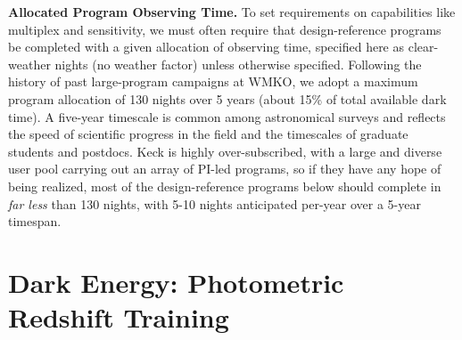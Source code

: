 \documentclass[11pt,a4paper,twoside,onecolumn,openany,final,oldfontcommands]{memoir}
\begin{document}
\noindent \textbf{Allocated Program Observing Time.}  To set requirements on capabilities like multiplex and sensitivity, we must often require that design-reference programs be completed with a given allocation of observing time, specified here as clear-weather nights (no weather factor) unless otherwise specified.  Following the history of past large-program campaigns at WMKO, we adopt a maximum program allocation of 130 nights over 5 years (about 15\% of total available dark time).  A five-year timescale is common among astronomical surveys and reflects the speed of scientific progress in the field and the timescales of graduate students and postdocs.  Keck is highly over-subscribed, with a large and diverse user pool carrying out an array of PI-led programs, so if they have any hope of being realized, most of the design-reference programs below should complete in \emph{far less} than 130 nights, with 5-10 nights anticipated per-year over a 5-year timespan.  


\section{Dark Energy: Photometric Redshift Training}
\label{sec:photozs}
\end{document}
